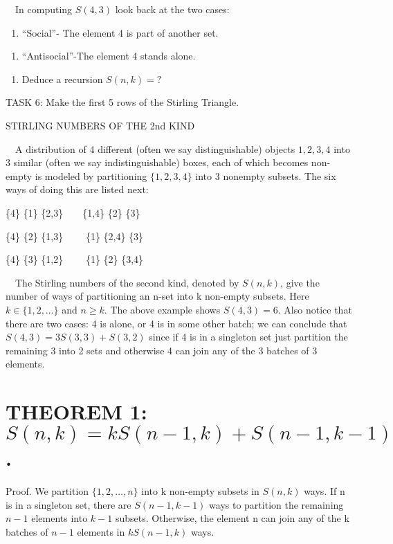 \documentclass{article}
\begin{document}
\ \ In computing  $S\left(4,3\right)$ look back at the two cases:

\begin{enumerate}
\item “Social”- The element 4 is part of another set. 
\end{enumerate}
\begin{enumerate}
\item “Antisocial”-The element 4 stands alone. 
\end{enumerate}
\begin{enumerate}
\item Deduce a recursion  $S\left(n,k\right)=?$
\end{enumerate}
TASK 6: Make the first 5 rows of the Stirling Triangle. 

STIRLING NUMBERS OF THE 2nd KIND

\ \ A distribution of 4 different (often we say distinguishable) objects  $1,2,3,4$ into 3 similar (often we say
indistinguishable) boxes, each of which becomes non-empty is modeled by partitioning  $\{1,2,3,4\}$ into 3 nonempty
subsets. The six ways of doing this are listed next:

\{4\} \{1\} \{2,3\}\ \ \ \ \{1,4\} \{2\} \{3\}

\{4\} \{2\} \{1,3\} \ \ \ \ \{1\} \{2,4\} \{3\}

\{4\} \{3\} \{1,2\} \ \ \ \ \{1\} \{2\} \{3,4\}

\ \ The Stirling numbers of the second kind, denoted by  $S(n,k)$, give the number of ways of partitioning an n-set into
k non-empty subsets. Here  $k{\in}\{1,2,{\dots}\}$ and $n{\geq}k$. The above example shows  $S\left(4,3\right)=6$. Also
notice that there are two cases: 4 is alone, or 4 is in some other batch; we can conclude that 
$S\left(4,3\right)=3S\left(3,3\right)+S(3,2)$ since if 4 is in a singleton set just partition the remaining 3 into 2
sets and otherwise 4 can join any of the 3 batches of 3 elements. 

\section[THEOREM 1: \ . ]{THEOREM 1:   $S\left(n,k\right)=\mathit{kS}\left(n-1,k\right)+S(n-1,k-1)$. }
Proof. We partition  $\{1,2,{\dots},n\}$ into k non-empty subsets in  $S(n,k)$ ways. If n is in a singleton set, there
are  $S(n-1,k-1)$ ways to partition the remaining   $n-1$ elements into  $k-1$ subsets. Otherwise, the element n can
join any of the k batches of   $n-1$ elements in  $\mathit{kS}(n-1,k)$ ways. 
\end{document}
